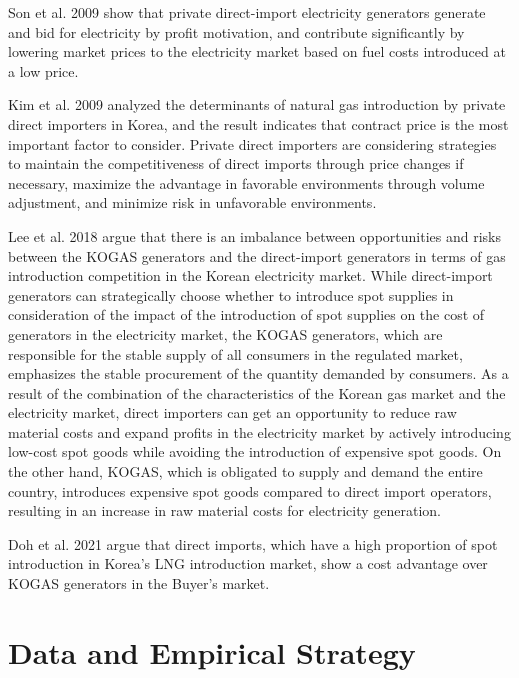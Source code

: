\documentclass[12pt]{article}
\begin{document}
Son et al. 2009 show that private direct-import electricity generators generate and bid for electricity by profit motivation, and contribute significantly by lowering market prices to the electricity market based on fuel costs introduced at a low price.

Kim et al. 2009 analyzed the determinants of natural gas introduction by private direct importers in Korea, and the result indicates that contract price is the most important factor to consider. Private direct importers are considering strategies to maintain the competitiveness of direct imports through price changes if necessary, maximize the advantage in favorable environments through volume adjustment, and minimize risk in unfavorable environments.

Lee et al. 2018 argue that there is an imbalance between opportunities and risks between the KOGAS generators and the direct-import generators in terms of gas introduction competition in the Korean electricity market. While direct-import generators can strategically choose whether to introduce spot supplies in consideration of the impact of the introduction of spot supplies on the cost of generators in the electricity market, the KOGAS generators, which are responsible for the stable supply of all consumers in the regulated market, emphasizes the stable procurement of the quantity demanded by consumers. As a result of the combination of the characteristics of the Korean gas market and the electricity market, direct importers can get an opportunity to reduce raw material costs and expand profits in the electricity market by actively introducing low-cost spot goods while avoiding the introduction of expensive spot goods. On the other hand, KOGAS, which is obligated to supply and demand the entire country, introduces expensive spot goods compared to direct import operators, resulting in an increase in raw material costs for electricity generation.

Doh et al. 2021 argue that direct imports, which have a high proportion of spot introduction in Korea's LNG introduction market, show a cost advantage over KOGAS generators in the Buyer's market.




\newpage
\section{Data and Empirical Strategy}
\end{document}
